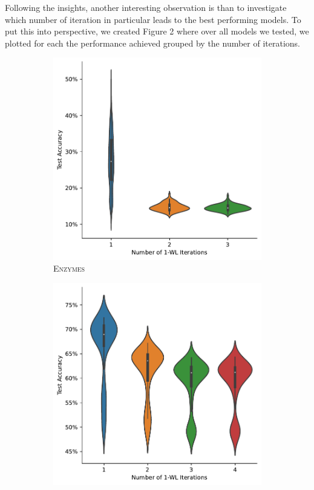 Following the insights, another interesting observation is than to investigate which number of \wl iteration in particular leads to the best performing models. To put this into perspective, we created Figure 2 where over all models we tested, we plotted for each the performance achieved grouped by the number of iterations. 

\begin{figure}
	\centering
	\begin{subfigure}[b]{0.19\textwidth}
		\centering
		\includegraphics[width=\textwidth]{Figures/k_wl_violin_ENZYMES.pdf}
        \caption{\scriptsize\textsc{Enzymes}}
	\end{subfigure}
	\hfill
	\begin{subfigure}[b]{0.19\textwidth}
		\centering
		\includegraphics[width=\textwidth]{Figures/k_wl_violin_IMDB-BINARY.pdf}

\end{subfigure}
\end{figure}
